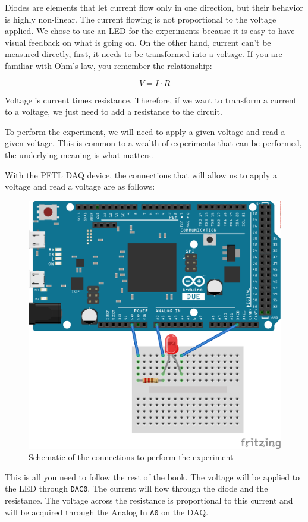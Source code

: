 Diodes are elements that let current flow only in one direction, but their behavior is highly non-linear. The current flowing is not proportional to the voltage applied. We chose to use an LED for the experiments because it is easy to have visual feedback on what is going on. On the other hand, current can't be measured directly, first, it needs to be transformed into a voltage. If you are familiar with Ohm's law, you remember the relationship:

\begin{equation}
V = I \cdot R
\end{equation}

Voltage is current times resistance. Therefore, if we want to transform a current to a voltage, we just need to add a resistance to the circuit. 

To perform the experiment, we will need to apply a given voltage and read a given voltage. This is common to a wealth of experiments that can be performed, the underlying meaning is what matters.

With the {PFTL DAQ} device, the connections that will allow us to apply a voltage and read a voltage are as follows:

\begin{figure}
\includegraphics[width=.5\textwidth]{images/Chapter_03/IV_scheme_bb.png} 
\caption{Schematic of the connections to perform the experiment}
\end{figure}

This is all you need to follow the rest of the book. The voltage will be applied to the LED through \texttt{DAC0}. The current will flow through the diode and the resistance. The voltage across the resistance is proportional to this current and will be acquired through the Analog In \texttt{A0} on the DAQ.


